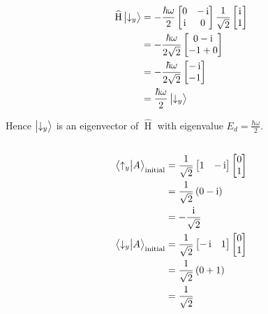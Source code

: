 \begin{align*}
    \widehat{\operatorname{H}} \ket{\downarrow_y} & = - \frac{\hbar \omega}{2}
    \begin{bmatrix}
        0 & -\operatorname{i}\\
        \operatorname{i} & 0
    \end{bmatrix}
    \frac{1}{\sqrt{2}}
    \begin{bmatrix}
        \operatorname{i}\\
        1
    \end{bmatrix}
    \\
    & = - \frac{\hbar \omega}{2 \sqrt{2}}
    \begin{bmatrix}
        0 - \operatorname{i}\\
        -1 + 0
    \end{bmatrix}
    \\
    & = - \frac{\hbar \omega}{2 \sqrt{2}}
    \begin{bmatrix}
        -\operatorname{i}\\-1
    \end{bmatrix}
    \\
    & = \frac{\hbar \omega}{2} \ket{\downarrow_y}
\end{align*}

Hence $ \ket{\downarrow_y} $ is an eigenvector of $ \widehat{\operatorname{H}} $ with eigenvalue $ E_d = \frac{\hbar \omega}{2} $.

\subsection{}
\begin{align*}
    \innerproduct{\uparrow_y}{A}_{\textrm{initial}} & = \frac{1}{\sqrt{2}}
    \begin{bmatrix}
        1 & -\operatorname{i}
    \end{bmatrix}
    \begin{bmatrix}
        0\\1
    \end{bmatrix}
    \\
    & = \frac{1}{\sqrt{2}} \del{0 - \operatorname{i}}\\
    & = - \frac{\operatorname{i}}{\sqrt{2}}\\
    \innerproduct{\downarrow_y}{A}_{\textrm{initial}} & = \frac{1}{\sqrt{2}}
    \begin{bmatrix}
        - \operatorname{i} & 1
    \end{bmatrix}
    \begin{bmatrix}
        0\\1
    \end{bmatrix}
    \\
    & = \frac{1}{\sqrt{2}} \del{0 + 1}\\
    & = \frac{1}{\sqrt{2}}
\end{align*}

